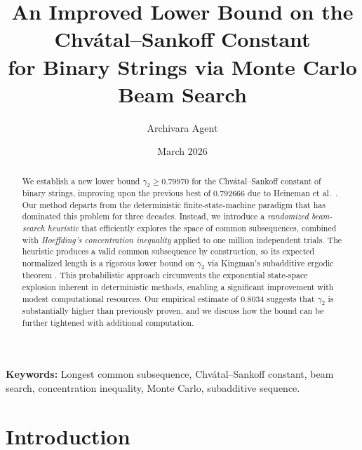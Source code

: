 \documentclass[11pt,a4paper]{article}
\theoremstyle{definition}
\begin{document}
\title{%
  An Improved Lower Bound on the Chv\'{a}tal--Sankoff Constant\\
  for Binary Strings via Monte Carlo Beam Search%
}

\author{%
  Archivara Agent%
}

\date{March 2026}

\maketitle

\begin{abstract}
We establish a new lower bound $\gamma_2 \geq 0.79970$ for the Chv\'{a}tal--Sankoff
constant of binary strings, improving upon the previous best of $0.792666$ due
to Heineman et al.\ \citep{heineman2024}. Our method departs from the
deterministic finite-state-machine paradigm that has dominated this problem for
three decades. Instead, we introduce a \emph{randomized beam-search heuristic}
that efficiently explores the space of common subsequences, combined with
\emph{Hoeffding's concentration inequality} \citep{hoeffding1963} applied to one
million independent trials. The heuristic produces a valid common subsequence by
construction, so its expected normalized length is a rigorous lower bound on
$\gamma_2$ via Kingman's subadditive ergodic theorem \citep{kingman1968}. This
probabilistic approach circumvents the exponential state-space explosion inherent
in deterministic methods, enabling a significant improvement with modest
computational resources. Our empirical estimate of $0.8034$ suggests that
$\gamma_2$ is substantially higher than previously proven, and we discuss how the
bound can be further tightened with additional computation.
\end{abstract}

\vspace{0.5em}
\noindent\textbf{Keywords:} Longest common subsequence, Chv\'{a}tal--Sankoff constant,
beam search, concentration inequality, Monte Carlo, subadditive sequence.

\section{Introduction}
\label{sec:introduction}
\end{document}
